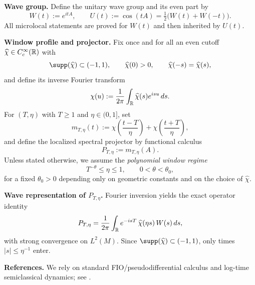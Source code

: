 \medskip
\noindent\textbf{Wave group.}
Define the unitary wave group and its even part by
\begin{equation}\label{eq:wave-group-A}
W(t):=e^{itA},\qquad
U(t):=\cos(tA)=\tfrac12\big(W(t)+W(-t)\big).
\end{equation}
All microlocal statements are proved for $W(t)$ and then inherited by $U(t)$.

\medskip
\noindent\textbf{Window profile and projector.}
Fix once and for all an even cutoff $\widehat\chi\in C_c^\infty(\mathbb{R})$ with
\begin{equation}\label{eq:chi-hat-A}
\supp(\widehat\chi)\subset(-1,1),\qquad \widehat\chi(0)>0,\qquad \widehat\chi(-s)=\widehat\chi(s),
\end{equation}
and define its inverse Fourier transform
\begin{equation}\label{eq:chi-def-A}
\chi(u):=\frac{1}{2\pi}\int_{\mathbb{R}}\widehat\chi(s)e^{isu}\,ds.
\end{equation}
For $(T,\eta)$ with $T\ge 1$ and $\eta\in(0,1]$, set
\begin{equation}\label{eq:multiplier-A}
m_{T,\eta}(t):=\chi\!\left(\frac{t-T}{\eta}\right)+\chi\!\left(\frac{t+T}{\eta}\right),
\end{equation}
and define the localized spectral projector by functional calculus
\begin{equation}\label{eq:projector-def-A}
P_{T,\eta}:=m_{T,\eta}(A).
\end{equation}
Unless stated otherwise, we assume the \emph{polynomial window regime}
\begin{equation}\label{eq:eta-regime-A}
T^{-\theta}\le \eta\le 1,\qquad 0<\theta<\theta_0,
\end{equation}
for a fixed $\theta_0>0$ depending only on geometric constants and on the choice of $\widehat\chi$.

\medskip
\noindent\textbf{Wave representation of $P_{T,\eta}$.}
Fourier inversion yields the exact operator identity
\begin{equation}\label{eq:projector-wave-A}
P_{T,\eta}
=\frac{1}{2\pi}\int_{\mathbb{R}} e^{-isT}\,\widehat\chi(\eta s)\,W(s)\,ds,
\end{equation}
with strong convergence on $L^2(M)$. Since $\supp(\widehat\chi)\subset(-1,1)$, only times $|s|\le \eta^{-1}$
enter.

\medskip
\noindent\textbf{References.}
We rely on standard FIO/pseudodifferential calculus and log-time semiclassical dynamics; see
\cite{Hormander1983,Hormander1985,DuistermaatGuillemin1975,Sogge2014,Zworski2012,DyatlovZworski2019}.

